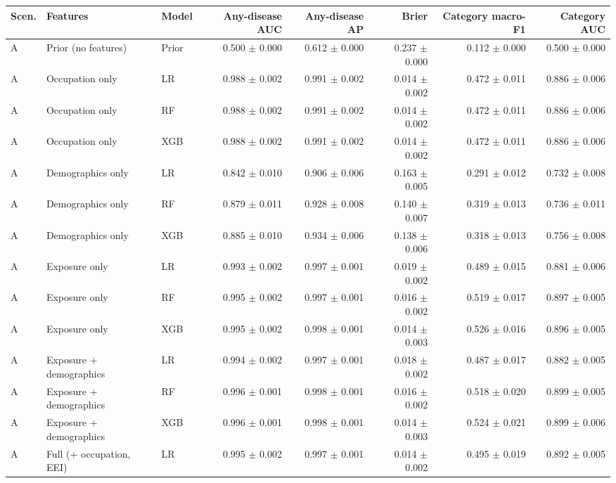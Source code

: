 \begin{tabular}{lllrrrrr}
\toprule
Scen. & Features & Model & Any-disease AUC & Any-disease AP & Brier & Category macro-F1 & Category AUC \\
\midrule
A & Prior (no features) & Prior & 0.500 $\pm$ 0.000 & 0.612 $\pm$ 0.000 & 0.237 $\pm$ 0.000 & 0.112 $\pm$ 0.000 & 0.500 $\pm$ 0.000 \\
\midrule
A & Occupation only & LR & 0.988 $\pm$ 0.002 & 0.991 $\pm$ 0.002 & 0.014 $\pm$ 0.002 & 0.472 $\pm$ 0.011 & 0.886 $\pm$ 0.006 \\
A & Occupation only & RF & 0.988 $\pm$ 0.002 & 0.991 $\pm$ 0.002 & 0.014 $\pm$ 0.002 & 0.472 $\pm$ 0.011 & 0.886 $\pm$ 0.006 \\
A & Occupation only & XGB & 0.988 $\pm$ 0.002 & 0.991 $\pm$ 0.002 & 0.014 $\pm$ 0.002 & 0.472 $\pm$ 0.011 & 0.886 $\pm$ 0.006 \\
\midrule
A & Demographics only & LR & 0.842 $\pm$ 0.010 & 0.906 $\pm$ 0.006 & 0.163 $\pm$ 0.005 & 0.291 $\pm$ 0.012 & 0.732 $\pm$ 0.008 \\
A & Demographics only & RF & 0.879 $\pm$ 0.011 & 0.928 $\pm$ 0.008 & 0.140 $\pm$ 0.007 & 0.319 $\pm$ 0.013 & 0.736 $\pm$ 0.011 \\
A & Demographics only & XGB & 0.885 $\pm$ 0.010 & 0.934 $\pm$ 0.006 & 0.138 $\pm$ 0.006 & 0.318 $\pm$ 0.013 & 0.756 $\pm$ 0.008 \\
\midrule
A & Exposure only & LR & 0.993 $\pm$ 0.002 & 0.997 $\pm$ 0.001 & 0.019 $\pm$ 0.002 & 0.489 $\pm$ 0.015 & 0.881 $\pm$ 0.006 \\
A & Exposure only & RF & 0.995 $\pm$ 0.002 & 0.997 $\pm$ 0.001 & 0.016 $\pm$ 0.002 & 0.519 $\pm$ 0.017 & 0.897 $\pm$ 0.005 \\
A & Exposure only & XGB & 0.995 $\pm$ 0.002 & 0.998 $\pm$ 0.001 & 0.014 $\pm$ 0.003 & 0.526 $\pm$ 0.016 & 0.896 $\pm$ 0.005 \\
\midrule
A & Exposure + demographics & LR & 0.994 $\pm$ 0.002 & 0.997 $\pm$ 0.001 & 0.018 $\pm$ 0.002 & 0.487 $\pm$ 0.017 & 0.882 $\pm$ 0.005 \\
A & Exposure + demographics & RF & 0.996 $\pm$ 0.001 & 0.998 $\pm$ 0.001 & 0.016 $\pm$ 0.002 & 0.518 $\pm$ 0.020 & 0.899 $\pm$ 0.005 \\
A & Exposure + demographics & XGB & 0.996 $\pm$ 0.001 & 0.998 $\pm$ 0.001 & 0.014 $\pm$ 0.003 & 0.524 $\pm$ 0.021 & 0.899 $\pm$ 0.006 \\
\midrule
A & Full (+ occupation, EEI) & LR & 0.995 $\pm$ 0.002 & 0.997 $\pm$ 0.001 & 0.014 $\pm$ 0.002 & 0.495 $\pm$ 0.019 & 0.892 $\pm$ 0.005 \\

\end{tabular}
